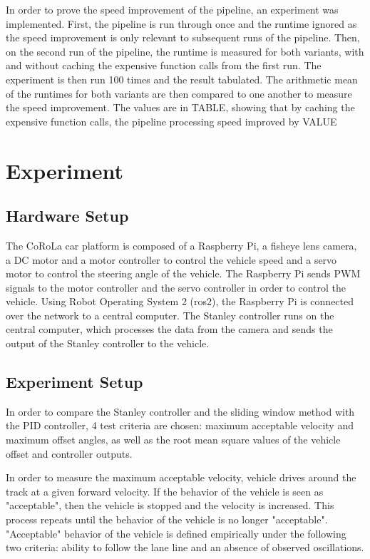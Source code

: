 \documentclass[arbeit=studie,oneside,BCOR=12mm]{ArbeitRST}
\begin{document}
In order to prove the speed improvement of the pipeline, an experiment was 
implemented. First, the pipeline is run through once and the runtime ignored as
the speed improvement is only relevant to subsequent runs of the pipeline. Then,
on the second run of the pipeline, the runtime is measured for both variants, 
with and without caching the expensive function calls from the first run. The 
experiment is then run 100 times and the result tabulated. The arithmetic mean 
of the runtimes for both variants are then compared to one another to measure 
the speed improvement. The values are in TABLE, showing that by caching the 
expensive function calls, the pipeline processing speed improved by VALUE%

\chapter{Experiment}
\section{Hardware Setup}
The CoRoLa car platform is composed of a Raspberry Pi, a fisheye lens camera, a
DC motor and a motor controller to control the vehicle speed and a servo motor
to control the steering angle of the vehicle. The Raspberry Pi sends PWM
signals to the motor controller and the servo controller in order to control
the vehicle. Using Robot Operating System 2 (ros2), the Raspberry Pi is
connected over the network to a central computer. The Stanley controller runs
on the central computer, which processes the data from the camera and sends the
output of the Stanley controller to the vehicle.

\section{Experiment Setup}
In order to compare the Stanley controller and the sliding window method with
the PID controller, 4 test criteria are chosen: maximum acceptable velocity and
maximum offset angles, as well as the root mean square values of the vehicle
offset and controller outputs.

In order to measure the maximum acceptable velocity, vehicle drives around the
track at a given forward velocity. If the behavior of the vehicle is seen as
"acceptable", then the vehicle is stopped and the velocity is increased. This
process repeats until the behavior of the vehicle is no longer "acceptable".
"Acceptable" behavior of the vehicle is defined empirically under the following
two criteria: ability to follow the lane line and an absence of observed
oscillations.
\end{document}
